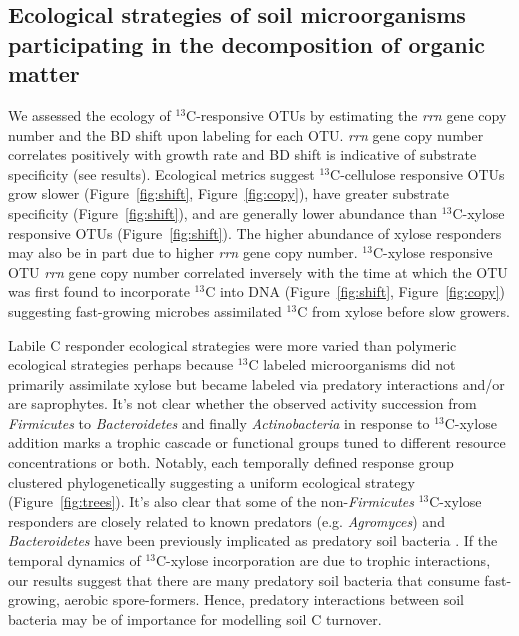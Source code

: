 \subsection{Ecological strategies of soil microorganisms participating in the
decomposition of organic matter}
We assessed the ecology of $^{13}$C-responsive OTUs by estimating the
\textit{rrn} gene copy number and the BD shift upon labeling for each OTU.
\textit{rrn} gene copy number correlates positively with growth rate
\citep{11125085} and BD shift is indicative of substrate specificity (see
results). Ecological metrics suggest $^{13}$C-cellulose responsive OTUs grow
slower (Figure~\ref{fig:shift}, Figure~\ref{fig:copy}), have greater substrate
specificity (Figure~\ref{fig:shift}), and are generally lower abundance than
$^{13}$C-xylose responsive OTUs (Figure~\ref{fig:shift}). The higher abundance
of xylose responders may also be in part due to higher \textit{rrn} gene copy
number. $^{13}$C-xylose responsive OTU \textit{rrn} gene copy number correlated
inversely with the time at which the OTU was first found to incorporate
$^{13}$C into DNA (Figure~\ref{fig:shift}, Figure~\ref{fig:copy}) suggesting
fast-growing microbes assimilated $^{13}$C from xylose before slow
growers.  

Labile C responder ecological strategies were more varied than polymeric
ecological strategies perhaps because $^{13}$C labeled microorganisms did
not primarily assimilate xylose but became labeled via predatory interactions
and/or are saprophytes. It's not clear whether the observed activity succession
from \textit{Firmicutes} to \textit{Bacteroidetes} and finally
\textit{Actinobacteria} in response to $^{13}$C-xylose addition marks a trophic
cascade or functional groups tuned to different resource concentrations or
both. Notably, each temporally defined response group clustered
phylogenetically suggesting a uniform ecological strategy
(Figure~\ref{fig:trees}). It's also clear that some of the
non-\textit{Firmicutes} $^{13}$C-xylose responders are closely related to known
predators (e.g. \textit{Agromyces}) and \textit{Bacteroidetes} have been
previously implicated as predatory soil bacteria \citep{Lueders2006}. If
the temporal dynamics of $^{13}$C-xylose incorporation are due to trophic
interactions, our results suggest that there are many predatory soil bacteria
that consume fast-growing, aerobic spore-formers. Hence, predatory interactions
between soil bacteria may be of importance for modelling soil C turnover.

